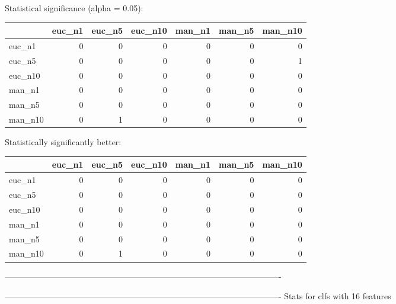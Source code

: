 Statistical significance (alpha = 0.05):
 \begin{tabular}{lrrrrrr}
\hline
         &   euc\_n1 &   euc\_n5 &   euc\_n10 &   man\_n1 &   man\_n5 &   man\_n10 \\
\hline
 euc\_n1  &        0 &        0 &         0 &        0 &        0 &         0 \\
 euc\_n5  &        0 &        0 &         0 &        0 &        0 &         1 \\
 euc\_n10 &        0 &        0 &         0 &        0 &        0 &         0 \\
 man\_n1  &        0 &        0 &         0 &        0 &        0 &         0 \\
 man\_n5  &        0 &        0 &         0 &        0 &        0 &         0 \\
 man\_n10 &        0 &        1 &         0 &        0 &        0 &         0 \\
\hline
\end{tabular} 

Statistically significantly better:
 \begin{tabular}{lrrrrrr}
\hline
         &   euc\_n1 &   euc\_n5 &   euc\_n10 &   man\_n1 &   man\_n5 &   man\_n10 \\
\hline
 euc\_n1  &        0 &        0 &         0 &        0 &        0 &         0 \\
 euc\_n5  &        0 &        0 &         0 &        0 &        0 &         0 \\
 euc\_n10 &        0 &        0 &         0 &        0 &        0 &         0 \\
 man\_n1  &        0 &        0 &         0 &        0 &        0 &         0 \\
 man\_n5  &        0 &        0 &         0 &        0 &        0 &         0 \\
 man\_n10 &        0 &        1 &         0 &        0 &        0 &         0 \\
\hline
\end{tabular} 

----------------------------------------------------------------------------------------------------



----------------------------------------------------------------------------------------------------
Stats for clfs with 16 features


